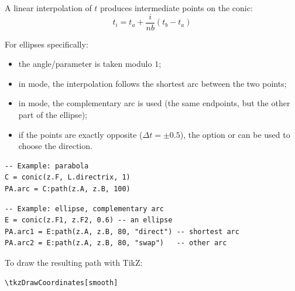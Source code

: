 A linear interpolation of $t$ produces intermediate points on the conic:
\[
t_i = t_a + \frac{i}{nb}(t_b - t_a)
\]

For ellipses specifically:
\begin{itemize}
  \item the angle/parameter is taken modulo $1$;
  \item in  mode, the interpolation follows the shortest arc
        between the two points;
  \item in  mode, the complementary arc is used
        (the same endpoints, but the other part of the ellipse);
  \item if the points are exactly opposite ($\Delta t = \pm 0.5$), the option
         or  can be used to choose the direction.
\end{itemize}

\medskip

\begin{mybox}
\begin{verbatim}
-- Example: parabola
C = conic(z.F, L.directrix, 1)
PA.arc = C:path(z.A, z.B, 100)
\end{verbatim}
\end{mybox}

\begin{mybox}
\begin{verbatim}
-- Example: ellipse, complementary arc
E = conic(z.F1, z.F2, 0.6) -- an ellipse
PA.arc1 = E:path(z.A, z.B, 80, "direct") -- shortest arc
PA.arc2 = E:path(z.A, z.B, 80, "swap")   -- other arc
\end{verbatim}
\end{mybox}

To draw the resulting path with TikZ:
\begin{mybox}
\begin{verbatim}
\tkzDrawCoordinates[smooth]
\end{verbatim}
\end{mybox}



